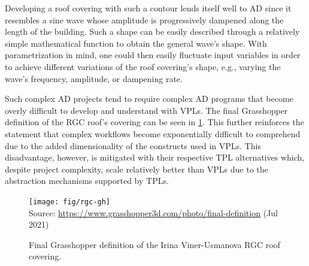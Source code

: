Developing a roof covering with such a contour lends itself well to \ac{AD}
since it resembles a sine wave whose amplitude is progressively dampened along
the length of the building.  Such a shape can be easily described through a
relatively simple mathematical function to obtain the general wave's shape.
With parametrization in mind, one could then easily fluctuate input variables in
order to achieve different variations of the roof covering's shape, e.g.,
varying the wave's frequency, amplitude, or dampening rate.

Such complex \ac{AD} projects tend to require complex \ac{AD} programs that
become overly difficult to develop and understand with \acp{VPL}.  The final
Grasshopper definition of the \ac{RGC} roof's covering can be seen in
\cref{fig:related.ad.vpl-scalability.rgc-gh}.  This further reinforces the
statement that complex workflows become exponentially difficult to comprehend
due to the added dimensionality of the constructs used in \acp{VPL}.  This
disadvantage, however, is mitigated with their respective \ac{TPL} alternatives
which, despite project complexity, scale relatively better than \acp{VPL} due to
the abstraction mechanisms supported by \acp{TPL}.

\begin{landscape}
\begin{figure}
  \texttt{[image: fig/rgc-gh]}\\
  {\scriptsize
  Source: \url{https://www.grasshopper3d.com/photo/final-definition} (Jul 2021)
  }
  \caption[Grasshopper definition of the \acl{RGC} roof covering]{
    Final Grasshopper definition of the Irina Viner-Usmanova \ac{RGC} roof
    covering.}%
  \label{fig:related.ad.vpl-scalability.rgc-gh}
\end{figure}
\end{landscape}
